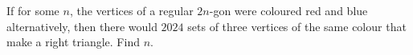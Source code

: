If for some $n$, the vertices of a regular $2n$-gon were coloured red and blue alternatively, then there would $2024$ sets of three vertices of the same colour that make a right triangle. Find $n$.
